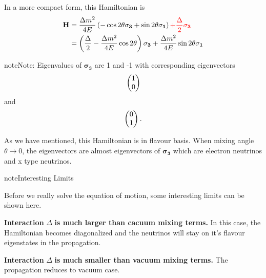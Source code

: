 \documentclass[letterpaper,12pt,english]{sphinxmanual}
\begin{document}
In a more compact form, this Hamiltonian is
\begin{gather}
\begin{split}\mathbf H &= \frac{ \Delta m^2 }{4E} \left( -\cos 2\theta \mathbf {\sigma_3 } + \sin 2\theta \mathbf{\sigma_1} \right)  {\color{red} + \frac{\Delta}{2} \mathbf {\sigma_3}} \\
& = \left(\frac{\Delta}{2} -\frac{ \Delta m^2 }{4E} \cos 2\theta\right) \mathbf {\sigma_3 } + \frac{ \Delta m^2 }{4E} \sin 2\theta \mathbf{\sigma_1}\end{split}\notag
\end{gather}
\begin{notice}{note}{Note:}
Eigenvalues of \(\mathbf {\sigma_3}\) are 1 and -1 with corresponding eigenvectors
\begin{gather}
\begin{split}\begin{pmatrix}1\\ 0 \end{pmatrix}\end{split}\notag
\end{gather}
and
\begin{gather}
\begin{split}\begin{pmatrix}0\\ 1 \end{pmatrix}.\end{split}\notag
\end{gather}\end{notice}

As we have mentioned, this Hamiltonian is in flavour basis. When mixing angle \(\theta \to 0\), the eigenvectors are almost eigenvectors of \(\mathbf{\sigma_3}\) which are electron neutrinos and x type neutrinos.

\begin{notice}{note}{Interesting Limits}

Before we really solve the equation of motion, some interesting limits can be shown here.

\textbf{Interaction} \(\Delta\) \textbf{is much larger than cacuum mixing terms.} In this case, the Hamiltonian becomes diagonalized and the neutrinos will stay on it's flavour eigenstates in the propagation.

\textbf{Interaction} \(\Delta\) \textbf{is much smaller than vacuum mixing terms.} The propagation reduces to vacuum case.
\end{notice}
\end{document}
